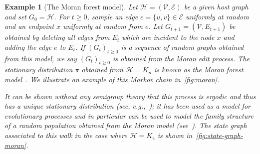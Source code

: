 \documentclass[11pt,a4paper]{article}
\newtheorem{example}[theorem]{Example}
\begin{document}
\begin{example}[The Moran forest model]\label{ex:moran-forest}\normalfont
	Let $\mathcal{H}=(\mathcal{V},\mathcal{E})$ be a given host graph and set $G_0=\mathcal{H}$. For $t\geq 0$, sample an edge $e=\{u, v\}\in \mathcal{E}$ uniformly at random and an endpoint $x$ uniformly at random from $e$. Let $G_{t+1} = (\mathcal{V}, E_{t+1})$ be obtained by deleting all edges from $E_{t}$ which are incident to the node $x$ and adding the edge $e$ to $E_t$. If $(G_t)_{t\geq 0}$ is a sequence of random graphs obtained from this model, we say $(G_t)_{t\geq 0}$ is obtained from the Moran edit process. The stationary distribution $\pi$ obtained from $\mathcal{H} = K_n$ is known as the \emph{Moran forest model}~\cite{bienvenuMoranForest2021}. We illustrate an example of this Markov chain in~\cref{fig:moran}.

    It can be shown without any semigroup theory that this process is ergodic and thus has a unique stationary distribution (see, e.g.,~\cite{bienvenuMoranForest2021}); it has been used as a model for evolutionary processes and in particular can be used to model the family structure of a random population obtained from the Moran model (see~\cite{durrett2008probability}). The state graph associated to this walk in the case where $\mathcal{H}=K_4$ is shown in~\cref{fig:state-graph-moran}.


\end{example}
\end{document}
